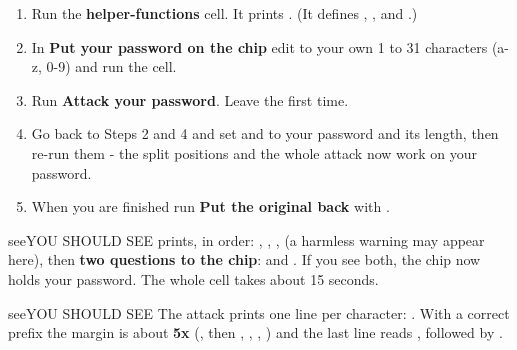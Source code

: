 \documentclass[11pt,letterpaper]{article}
\begin{document}
\vspace{4pt}


\begin{enumerate}[label=\arabic*.,leftmargin=1.8em,itemsep=2pt,topsep=2pt,parsep=0pt,start=1]
\item Run the \textbf{helper-functions} cell. It prints . (It defines , ,  and .)
\item In \textbf{Put your password on the chip} edit  to your own 1 to 31 characters (a-z, 0-9) and run the cell.
\item Run \textbf{Attack your password}. Leave  the first time.
\item Go back to Steps 2 and 4 and set  and  to your password and its length, then re-run them - the split positions and the whole attack now work on your password.
\item When you are finished run \textbf{Put the original back} with .
\end{enumerate}

\begin{guidecallout}{see}{YOU SHOULD SEE}
 prints, in order: ,
, ,  (a harmless  warning may appear
here), then \textbf{two questions to the chip}:  and . If you see both, the chip now holds your
password. The whole cell takes about 15 seconds.
\end{guidecallout}

\begin{guidecallout}{see}{YOU SHOULD SEE}
The attack prints one line per character: . With a correct prefix the margin is about \textbf{5x} (, then ,
, , ) and the last line reads , followed by .
\end{guidecallout}
\end{document}
